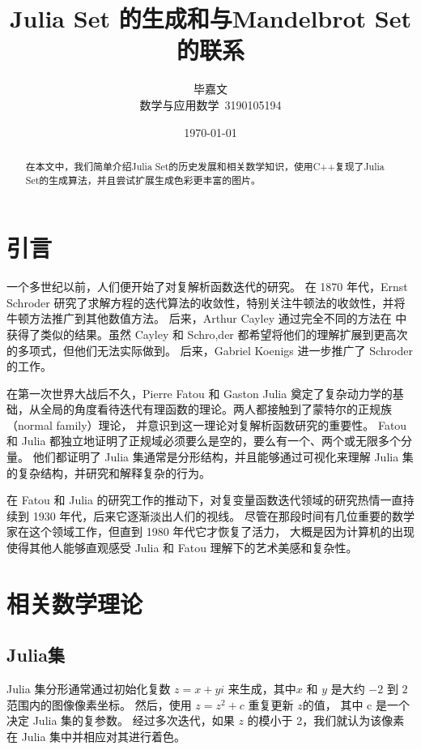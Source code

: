 \documentclass[UTF8]{ctexart}
\title{Julia Set 的生成和与Mandelbrot Set的联系}
\author{毕嘉文 \\ 数学与应用数学\ 3190105194}
\date{\today}
\begin{document}
\maketitle
\begin{abstract}
在本文中，我们简单介绍Julia Set的历史发展和相关数学知识，使用C++复现了Julia Set的生成算法，并且尝试扩展生成色彩更丰富的图片。
\end{abstract}

\section{引言}
一个多世纪以前，人们便开始了对复解析函数迭代的研究。
在 1870 年代，Ernst Schroder \cite{Schroder1870,Schroder1871}
研究了求解方程的迭代算法的收敛性，特别关注牛顿法的收敛性，并将牛顿方法推广到其他数值方法。
后来，Arthur Cayley 通过完全不同的方法在 \cite{cayley_2009} 中获得了类似的结果。虽然 Cayley 和 Schro,der 都希望将他们的理解扩展到更高次的多项式，但他们无法实际做到。
后来，Gabriel Koenigs \cite{ASENS_1884_3_1__S3_0} 进一步推广了 Schroder 的工作。

在第一次世界大战后不久，Pierre Fatou \cite{BSMF_1922__50__37_1,BSMF_1920__48__208_1} 和 Gaston Julia \cite{GastonJulia1918}
奠定了复杂动力学的基础，从全局的角度看待迭代有理函数的理论。两人都接触到了蒙特尔的正规族（normal family）理论，
并意识到这一理论对复解析函数研究的重要性。 Fatou 和 Julia 都独立地证明了正规域必须要么是空的，要么有一个、两个或无限多个分量。
他们都证明了 Julia 集通常是分形结构，并且能够通过可视化来理解 Julia 集的复杂结构，并研究和解释复杂的行为。

在 Fatou 和 Julia 的研究工作的推动下，对复变量函数迭代领域的研究热情一直持续到 1930 年代，后来它逐渐淡出人们的视线。
尽管在那段时间有几位重要的数学家在这个领域工作，但直到 1980 年代它才恢复了活力，
大概是因为计算机的出现使得其他人能够直观感受 Julia 和 Fatou 理解下的艺术美感和复杂性。\cite{10.1007/978-3-319-08105-2_3}

\section{相关数学理论}

\subsection{Julia集}

Julia 集分形通常通过初始化复数 $z = x + yi$ 来生成，其中$x$ 和 $y$ 是大约 $-2$ 到 $2$ 范围内的图像像素坐标。
然后，使用 $z = z^2 + c$ 重复更新 $z $的值， 其中 c 是一个决定 Julia 集的复参数。 
经过多次迭代，如果 $z$ 的模小于 2，我们就认为该像素在 Julia 集中并相应对其进行着色。 
\end{document}
